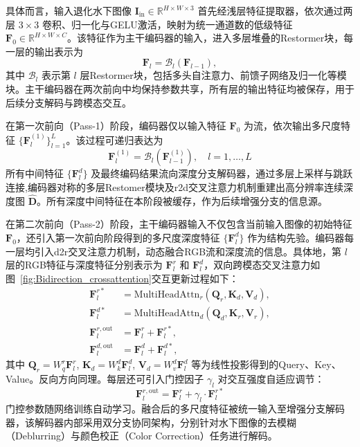 \documentclass[twocolumn]{article}
\begin{document}
具体而言，输入退化水下图像 $\mathbf{I}_{\text{in}} \in \mathbb{R}^{H \times W \times 3}$ 首先经浅层特征提取器，依次通过两层 $3 \times 3$ 卷积、归一化与GELU激活，映射为统一通道数的低级特征 $\mathbf{F}_0 \in \mathbb{R}^{H \times W \times C}$。该特征作为主干编码器的输入，进入多层堆叠的Restormer块，每一层的输出表示为
\[
\mathbf{F}_l = \mathcal{B}_l(\mathbf{F}_{l-1}),
\]
其中 $\mathcal{B}_l$ 表示第 $l$ 层Restormer块，包括多头自注意力、前馈子网络及归一化等模块。主干编码器在两次前向中均保持参数共享，所有层的输出特征均被保存，用于后续分支解码与跨模态交互。

在第一次前向（Pass-1）阶段，编码器仅以输入特征 $\mathbf{F}_0$ 为流，依次输出多尺度特征 $\{\mathbf{F}_l^{(1)}\}_{l=1}^L$。该过程可递归表达为
\[
\mathbf{F}_l^{(1)} = \mathcal{B}_l(\mathbf{F}_{l-1}^{(1)}),\quad l=1,\ldots,L
\]
所有中间特征 $\{\mathbf{F}_l^{d}\}$ 及最终编码结果流向深度分支解码器，通过多层上采样与跳跃连接,编码器对称的多层Restomer模块及r2d交叉注意力机制重建出高分辨率连续深度图 $\hat{\mathbf{D}}$。所有深度中间特征在本阶段被缓存，作为后续增强分支的信息源。


在第二次前向（Pass-2）阶段，主干编码器输入不仅包含当前输入图像的初始特征 $\mathbf{F}_0$，还引入第一次前向阶段得到的多尺度深度特征 $\{\mathbf{F}_l^{d}\}$ 作为结构先验。编码器每一层均引入d2r交叉注意力机制，动态融合RGB流和深度流的信息。具体地，第 $l$ 层的RGB特征与深度特征分别表示为 $\mathbf{F}_l^{r}$ 和 $\mathbf{F}_l^{d}$，双向跨模态交叉注意力如图~\ref{fig:Bidirection_crossattention}交互更新过程如下：
\[
\begin{aligned}
\mathbf{F}_l^{r*} &= \mathrm{MultiHeadAttn}_r\left(\mathbf{Q}_r, \mathbf{K}_d, \mathbf{V}_d\right), \\
\mathbf{F}_l^{d*} &= \mathrm{MultiHeadAttn}_d\left(\mathbf{Q}_d, \mathbf{K}_r, \mathbf{V}_r\right), \\
\mathbf{F}_l^{r,\text{out}} &= \mathbf{F}_l^{r} + \mathbf{F}_l^{r*}, \\
\mathbf{F}_l^{d,\text{out}} &= \mathbf{F}_l^{d} + \mathbf{F}_l^{d*},
\end{aligned}
\]
其中 $\mathbf{Q}_r = W_q^r \mathbf{F}_l^{r}$, $\mathbf{K}_d = W_k^d \mathbf{F}_l^{d}$, $\mathbf{V}_d = W_v^d \mathbf{F}_l^{d}$ 等为线性投影得到的Query、Key、Value。反向方向同理。每层还可引入门控因子 $\gamma_l$ 对交互强度自适应调节：
\[
\mathbf{F}_l^{r,\text{out}} = \mathbf{F}_l^{r} + \gamma_l \cdot \mathbf{F}_l^{r*}
\]
门控参数随网络训练自动学习。融合后的多尺度特征被统一输入至增强分支解码器，该解码器内部采用双分支协同架构，分别针对水下图像的去模糊（Deblurring）与颜色校正（Color Correction）任务进行解码。
\end{document}
